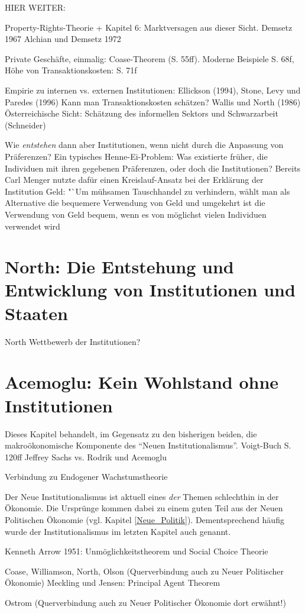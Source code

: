 HIER WEITER:


Property-Rights-Theorie + Kapitel 6: Marktversagen aus dieser Sicht.
Demsetz 1967
Alchian und Demsetz 1972 \parencite{Alchian1973}

Private Geschäfte, einmalig: Coase-Theorem (S. 55ff). Moderne Beispiele S. 68f, Höhe von Transaktionskosten: S. 71f


Empirie zu internen vs. externen Institutionen: Ellickson (1994), Stone, Levy und Paredes (1996)
Kann man Transaktionskosten schätzen? Wallis und North (1986)
Österreichische Sicht: Schätzung des informellen Sektors und Schwarzarbeit (Schneider)









 Wie \textit{entstehen} dann aber Institutionen, wenn nicht durch die Anpassung von Präferenzen? Ein typisches Henne-Ei-Problem: Was existierte früher, die Individuen mit ihren gegebenen Präferenzen, oder doch die Institutionen? Bereits Carl Menger nutzte dafür einen Kreislauf-Ansatz bei der Erklärung der Institution Geld: "`Um mühsamen Tauschhandel zu verhindern, wählt man als Alternative die bequemere Verwendung von Geld und umgekehrt ist die Verwendung von Geld bequem, wenn es von möglichst vielen Individuen verwendet wird \parencite[S.176]{Hodgson1998}



\section{North: Die Entstehung und Entwicklung von Institutionen und Staaten}
North
Wettbewerb der Institutionen?



\section{Acemoglu: Kein Wohlstand ohne Institutionen}

Dieses Kapitel behandelt, im Gegensatz zu den bisherigen beiden, die makroökonomische Komponente des "`Neuen Institutionalismus"'. 
Voigt-Buch S. 120ff
Jeffrey Sachs vs. Rodrik und Acemoglu



Verbindung zu Endogener Wachstumstheorie \textcite[S. 633ff]{Snowdon2005}

Der Neue Institutionalismus ist aktuell eines \textit{der} Themen schlechthin in der Ökonomie. Die Ursprünge kommen dabei zu einem guten Teil aus der Neuen Politischen Ökonomie (vgl. Kapitel \ref{Neue_Politik}). Dementsprechend häufig wurde der Institutionalismus im letzten Kapitel auch genannt.





Kenneth Arrow 1951: Unmöglichkeitstheorem und Social Choice Theorie




Coase, Williamson, North, Olson (Querverbindung auch zu Neuer Politischer Ökonomie)
Meckling und Jensen: Principal Agent Theorem



Ostrom (Querverbindung auch zu Neuer Politischer Ökonomie dort erwähnt!)



